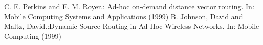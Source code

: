 \documentclass[runningheads]{llncs}
\begin{document}
\begin{thebibliography}{5}
C. E. Perkins and E. M. Royer.: Ad-hoc on-demand distance vector routing. In: Mobile Computing Systems and Applications (1999)
B. Johnson, David and Maltz, David.:Dynamic Source Routing in Ad Hoc Wireless Networks. In: Mobile Computing (1999)



%
%

\end{thebibliography}
\end{document}
